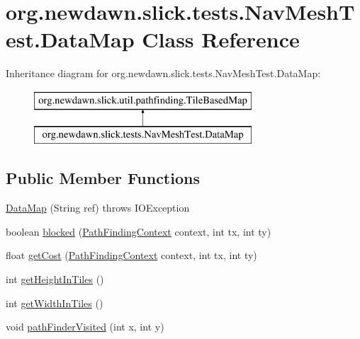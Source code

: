 \hypertarget{classorg_1_1newdawn_1_1slick_1_1tests_1_1_nav_mesh_test_1_1_data_map}{}\section{org.\+newdawn.\+slick.\+tests.\+Nav\+Mesh\+Test.\+Data\+Map Class Reference}
\label{classorg_1_1newdawn_1_1slick_1_1tests_1_1_nav_mesh_test_1_1_data_map}
Inheritance diagram for org.\+newdawn.\+slick.\+tests.\+Nav\+Mesh\+Test.\+Data\+Map\+:\begin{figure}[H]
\begin{center}
\leavevmode
\includegraphics[height=2.000000cm]{classorg_1_1newdawn_1_1slick_1_1tests_1_1_nav_mesh_test_1_1_data_map}
\end{center}
\end{figure}
\subsection*{Public Member Functions}
\begin{DoxyCompactItemize}
\item 
\mbox{\hyperlink{classorg_1_1newdawn_1_1slick_1_1tests_1_1_nav_mesh_test_1_1_data_map_a6f7a99c8153df6e09527f400345b5364}{Data\+Map}} (String ref)  throws I\+O\+Exception 
\item 
boolean \mbox{\hyperlink{classorg_1_1newdawn_1_1slick_1_1tests_1_1_nav_mesh_test_1_1_data_map_abb481ef621cd7b14c3dd9aedfb49c90f}{blocked}} (\mbox{\hyperlink{interfaceorg_1_1newdawn_1_1slick_1_1util_1_1pathfinding_1_1_path_finding_context}{Path\+Finding\+Context}} context, int tx, int ty)
\item 
float \mbox{\hyperlink{classorg_1_1newdawn_1_1slick_1_1tests_1_1_nav_mesh_test_1_1_data_map_a94ee56daa57d506c05a25d4198032ba8}{get\+Cost}} (\mbox{\hyperlink{interfaceorg_1_1newdawn_1_1slick_1_1util_1_1pathfinding_1_1_path_finding_context}{Path\+Finding\+Context}} context, int tx, int ty)
\item 
int \mbox{\hyperlink{classorg_1_1newdawn_1_1slick_1_1tests_1_1_nav_mesh_test_1_1_data_map_a17b7ae15c28e0d59d4ef2f789f13dad9}{get\+Height\+In\+Tiles}} ()
\item 
int \mbox{\hyperlink{classorg_1_1newdawn_1_1slick_1_1tests_1_1_nav_mesh_test_1_1_data_map_a9c463e2f4c3c3c208961d40e40529cb3}{get\+Width\+In\+Tiles}} ()
\item 
void \mbox{\hyperlink{classorg_1_1newdawn_1_1slick_1_1tests_1_1_nav_mesh_test_1_1_data_map_af2bca0a48cb72d6e19d4c6e4ffcd6dba}{path\+Finder\+Visited}} (int x, int y)
\end{DoxyCompactItemize}
